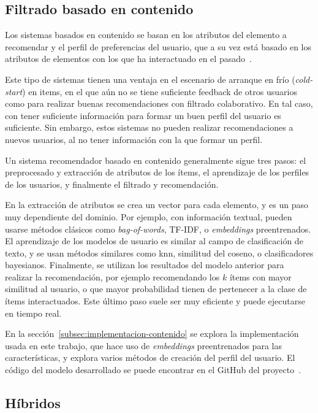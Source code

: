 \subsection{Filtrado basado en contenido}
\label{subsec:recsys-content}

Los sistemas basados en contenido se basan en los atributos del elemento a recomendar y el perfil de preferencias del usuario, que a su vez está basado en los atributos de elementos con los que ha interactuado en el pasado~\cite{aggarwal_recommender_2016}.

Este tipo de sistemas tienen una ventaja en el escenario de arranque en frío (\textit{cold-start}) en items, en el que aún no se tiene suficiente feedback de otros usuarios como para realizar buenas recomendaciones con filtrado colaborativo. En tal caso, con tener suficiente información para formar un buen perfil del usuario es suficiente. Sin embargo, estos sistemas no pueden realizar recomendaciones a nuevos usuarios, al no tener información con la que formar un perfil.

Un sistema recomendador basado en contenido generalmente sigue tres pasos: el preprocesado y extracción de atributos de los ítems, el aprendizaje de los perfiles de los usuarios, y finalmente el filtrado y recomendación.

En la extracción de atributos se crea un vector para cada elemento, y es un paso muy dependiente del dominio. Por ejemplo, con información textual, pueden usarse métodos clásicos como \textit{bag-of-words}, TF-IDF, o \textit{embeddings} preentrenados. El aprendizaje de los modelos de usuario es similar al campo de clasificación de texto, y se usan métodos similares como \gls{knn}, similitud del coseno, o clasificadores bayesianos. Finalmente, se utilizan los resultados del modelo anterior para realizar la recomendación, por ejemplo recomendando los $k$ ítems con mayor similitud al usuario, o que mayor probabilidad tienen de pertenecer a la clase de ítems interactuados. Este último paso suele ser muy eficiente y puede ejecutarse en tiempo real.

En la sección~\ref{subsec:implementacion-contenido} se explora la implementación usada en este trabajo, que hace uso de \textit{embeddings} preentrenados para las características, y explora varios métodos de creación del perfil del usuario. El código del modelo desarrollado se puede encontrar en el GitHub del proyecto~\cite{davo_daviddavoupm-tfm-notebooks_2024}.

\subsection{Híbridos}

